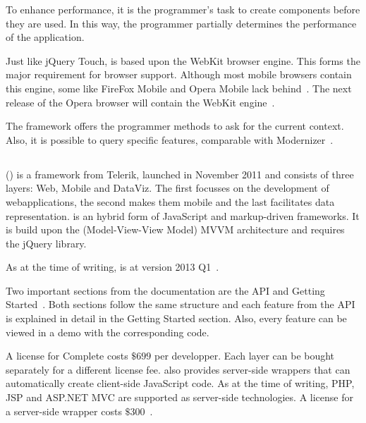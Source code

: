 \documentclass[a4paper]{artikel3}
\newcommand{\setspace}[0]{\vspace{2mm}}
\renewcommand{\paragraph}[1]{\setspace \noindent {\bf #1}  }
\begin{document}
To enhance performance,  it is the programmer's task to create components before they are used.  
In this way,  the programmer partially determines the performance of the application.

\paragraph{Browser support}
Just like jQuery Touch,  \sta{} is based upon the WebKit browser engine.  
This forms the major requirement for browser support.  
Although most mobile browsers contain this engine,  some like FireFox Mobile and Opera Mobile lack behind~\cite{JohnEClark2012}.  
The next release of the Opera browser will contain the WebKit engine~\cite{Wokke2013}.

The framework offers the programmer methods to ask for the current context.
Also,  it is possible to query specific features,  comparable with Modernizer~\cite{Modernizr2012}.  


\subsection{\kendo} %
\label{sec:frameworks-kendo}

\kendo{} (\kendoa{}) is a framework from Telerik,  launched in November 2011 and consists of three layers:  Web,  Mobile and DataViz.
The first focusses on the development of webapplications,  the second makes them mobile and the last facilitates data representation.
\kendoa{} is an hybrid form of JavaScript and markup-driven frameworks.
It is build upon the (Model-View-View Model) MVVM architecture and requires the jQuery library.

As at the time of writing,  \kendoa{} is at version 2013 Q1~\cite{Telerike}. 

\paragraph{Documentation}
Two important sections from the documentation are the API and Getting Started~\cite{Telerikd}.
Both sections follow the same structure and each feature from the API is explained in detail in the Getting Started section.
Also,  every feature can be viewed in a demo with the corresponding code.

\paragraph{License}
A license for \kendoa{} Complete costs $\$699$ per developper.
Each layer can be bought separately for a different license fee.
\kendoa{} also provides server-side wrappers that can automatically create client-side JavaScript code.
As at the time of writing, PHP,  JSP and ASP.NET MVC are supported as server-side technologies.
A license for a server-side wrapper costs $\$300$~\cite{Telerike}.
\end{document}
